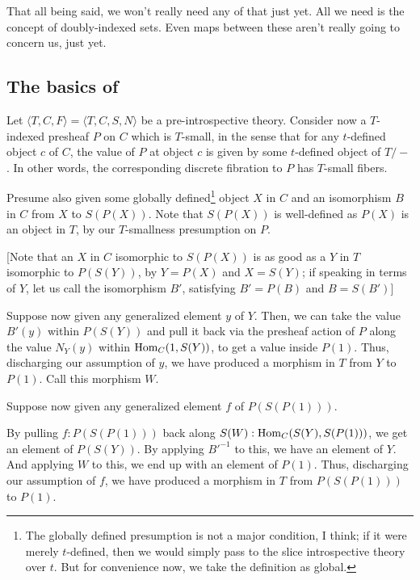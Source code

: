 That all being said, we won't really need any of that just yet. All we need is the concept of doubly-indexed sets. Even maps between these aren't really going to concern us, just yet.

\subsection{The basics of \Loeb}
Let $\langle T, C, F \rangle = \langle T, C, S, N \rangle$ be a pre-introspective theory. Consider now a $T$-indexed presheaf $P$ on $C$ which is $T$-small, in the sense that for any $t$-defined object $c$ of $C$, the value of $P$ at object $c$ is given by some $t$-defined object of $T/-$. In other words, the corresponding discrete fibration to $P$ has $T$-small fibers.

Presume also given some globally defined\footnote{The globally defined presumption is not a major condition, I think; if it were merely $t$-defined, then we would simply pass to the slice introspective theory over $t$. But for convenience now, we take the definition as global. } object $X$ in $C$ and an isomorphism $B$ in $C$ from $X$ to $S(P(X))$. Note that $S(P(X))$ is well-defined as $P(X)$ is an object in $T$, by our $T$-smallness presumption on $P$.

[Note that an $X$ in $C$ isomorphic to $S(P(X))$ is as good as a $Y$ in $T$ isomorphic to $P(S(Y))$, by $Y = P(X)$ and $X = S(Y)$; if speaking in terms of $Y$, let us call the isomorphism $B'$, satisfying $B' = P(B)$ and $B = S(B')$]

Suppose now given any generalized element $y$ of $Y$. Then, we can take the value $B'(y)$ within $P(S(Y))$ and pull it back via the presheaf action of $P$ along the value $N_Y(y)$ within $\operatorname{Hom}_C(1, S(Y))$, to get a value inside $P(1)$. Thus, discharging our assumption of $y$, we have produced a morphism in $T$ from $Y$ to $P(1)$. Call this morphism $W$.

Suppose now given any generalized element $f$ of $P(S(P(1)))$.

By pulling $f :P(S(P(1)))$ back along $S(W) : \operatorname{Hom}_C(S(Y), S(P(1)))$, we get an element of $P(S(Y))$. By applying $B'^{-1}$ to this, we have an element of $Y$. And applying $W$ to this, we end up with an element of $P(1)$. Thus, discharging our assumption of $f$, we have produced a morphism in $T$ from $P(S(P(1)))$ to $P(1)$.

